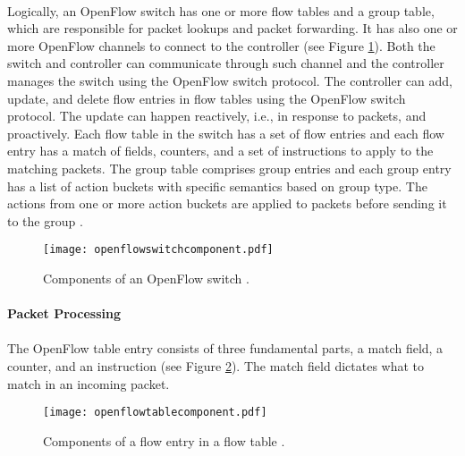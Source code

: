 \paragraph{}
Logically, an OpenFlow switch has one or more flow tables and a group table, which are responsible for packet lookups and packet forwarding. It has also one or more OpenFlow channels to connect to the controller (see Figure \ref{fig:ofscomp}). Both the switch and controller can communicate through such channel and the controller manages the switch using the OpenFlow switch protocol. The controller can add, update, and delete flow entries in flow tables using the OpenFlow switch protocol. The update can happen reactively, i.e., in response to packets, and proactively. Each flow table in the switch has a set of flow entries and each flow entry has a match of fields, counters, and a set of instructions to apply to the matching packets. The group table comprises group entries and each group entry has a list of action buckets with specific semantics based on group type. The actions from one or more action buckets are applied to packets before sending it to the group \cite{openflowspecification13}.

\begin{figure}[H]
\begin{center}
	{\texttt{[image: openflowswitchcomponent.pdf]}}
	\caption{Components of an OpenFlow switch \cite{openflowspecification13}.}
	\label{fig:ofscomp}
\end{center}
\end{figure}

\paragraph{Packet Processing}
\paragraph{}
The OpenFlow table entry consists of three fundamental parts, a match field, a counter, and an instruction (see Figure \ref{fig:oftcomp}). The match field dictates what to match in an incoming packet.

\begin{figure}[H]
\begin{center}
	\resizebox{\textwidth}{!}
	{\texttt{[image: openflowtablecomponent.pdf]}}
	\caption{Components of a flow entry in a flow table \cite{openflowspecification13}.}
	\label{fig:oftcomp}
\end{center}
\end{figure}

